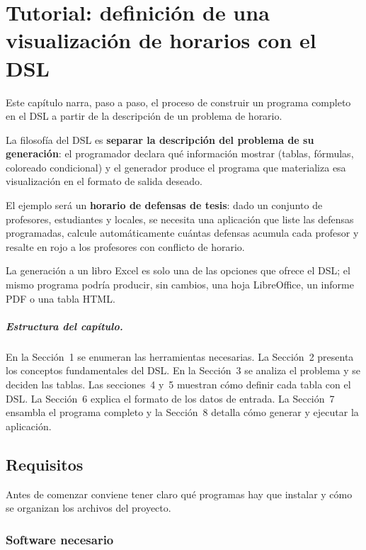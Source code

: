 \documentclass[12pt,a4paper]{report}
\begin{document}
\chapter{Tutorial: definición de una visualización de horarios con el DSL}
\label{cap:tutorial}

Este capítulo narra, paso a paso, el proceso de construir un programa completo
en el DSL a partir de la descripción de un problema de horario.

La filosofía del DSL es \textbf{separar la descripción del problema de su
generación}: el programador declara qué información mostrar (tablas, fórmulas,
coloreado condicional) y el generador produce el programa que materializa esa
visualización en el formato de salida deseado.

El ejemplo será un \textbf{horario de defensas de tesis}: dado un conjunto de
profesores, estudiantes y locales, se necesita una aplicación que liste
las defensas programadas, calcule automáticamente cuántas defensas acumula
cada profesor y resalte en rojo a los profesores con conflicto de horario.

La generación a un libro Excel es solo una de las opciones que ofrece el DSL;
el mismo programa podría producir, sin cambios, una hoja LibreOffice, un
informe PDF o una tabla HTML.

\paragraph{Estructura del capítulo.}
En la Secci\'on~1 se enumeran las herramientas necesarias.
La Secci\'on~2 presenta los conceptos fundamentales del DSL.
En la Secci\'on~3 se analiza el problema y se deciden las
tablas.  Las secciones~4 y~5 muestran c\'omo definir cada tabla
con el DSL.  La Secci\'on~6 explica el formato de los datos de entrada.
La Secci\'on~7 ensambla el programa completo y
la Secci\'on~8 detalla c\'omo generar y ejecutar la aplicaci\'on.

\section{Requisitos}
\label{sec:requisitos}

Antes de comenzar conviene tener claro qué programas hay que instalar y cómo
se organizan los archivos del proyecto.

\subsection{Software necesario}
\end{document}
